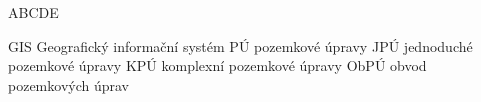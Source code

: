 
\begin{seznamzkratek}{ABCDE}

	      {GIS}
	      {Geografický informační systém}
	      {PÚ}
	      {pozemkové úpravy}
	      {JPÚ}
	      {jednoduché pozemkové úpravy}
	      {KPÚ}
	      {komplexní pozemkové úpravy}
	      {ObPÚ}
	      {obvod pozemkových úprav}
	      
\end{seznamzkratek}